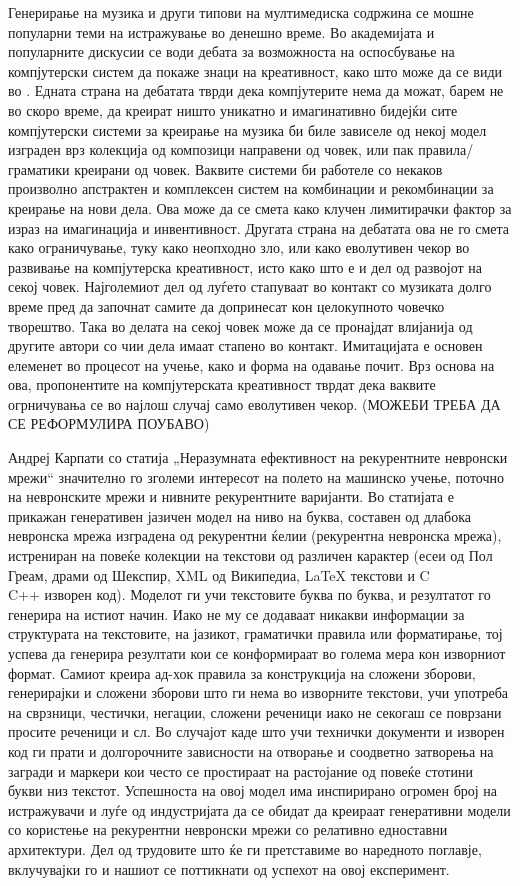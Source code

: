 Генерирање на музика и други типови на мултимедиска содржина се мошне популарни теми на истражување во денешно време. Во академијата и популарните дискусии се води дебата за возможноста на оспосбување на компјутерски систем да покаже знаци на креативност, како што може да се види во \cite{Ghedini2015}. Едната страна на дебатата тврди дека компјутерите нема да можат, барем не во скоро време, да креират ништо уникатно и имагинативно бидејќи сите компјутерски системи за креирање на музика би биле зависеле од некој модел изграден врз колекција од композици направени од човек, или пак правила/граматики креирани од човек. Ваквите системи би работеле со некаков произволно апстрактен и комплексен систем на комбинации и рекомбинации за креирање на нови дела. Ова може да се смета како клучен лимитирачки фактор за израз на имагинација и инвентивност. Другата страна на дебатата ова не го смета како ограничување, туку како неопходно зло, или како еволутивен чекор во развивање на компјутерска креативност, исто како што е и дел од развојот на секој човек. Најголемиот дел од луѓето стапуваат во контакт со музиката долго време пред да започнат самите да допринесат кон целокупното човечко творештво. Така во делата на секој човек може да се пронајдат влијанија од другите автори со чии дела имаат стапено во контакт. Имитацијата е основен елеменет во процесот на учење, како и форма на одавање почит. Врз основа на ова, пропонентите на компјутерската креативност тврдат дека ваквите огрничувања се во најлош случај само еволутивен чекор. (МОЖЕБИ ТРЕБА ДА СЕ РЕФОРМУЛИРА ПОУБАВО)

Андреј Карпати со статија „Неразумната ефективност на рекурентните невронски мрежи“ \cite{AndrejKarpathy2015} значително го зголеми интересот на полето на машинско учење, поточно на невронските мрежи и нивните рекурентните варијанти. Во статијата е прикажан генеративен јазичен модел на ниво на буква, составен од длабока невронска мрежа изградена од рекурентни ќелии (рекурентна невронска мрежа), истрениран на повеќе колекции на текстови од различен карактер (есеи од Пол Греам, драми од Шекспир, XML од Википедиа, LaTeX текстови и C\\C++ изворен код). Моделот ги учи текстовите буква по буква, и резултатот го генерира на истиот начин. Иако не му се додаваат никакви информации за структурата на текстовите, на јазикот, граматички правила или форматирање, тој успева да генерира резултати кои се конформираат во голема мера кон изворниот формат. Самиот креира ад-хок правила за конструкција на сложени зборови, генерирајки и сложени зборови што ги нема во изворните текстови, учи употреба на сврзници, честички, негации, сложени реченици иако не секогаш се поврзани просите реченици и сл. Во случајот каде што учи технички документи и изворен код ги прати и долгорочните зависности на отворање и соодветно затворења на загради и маркери кои често се простираат на растојание од повеќе стотини букви низ текстот. Успешноста на овој модел има инспирирано огромен број на истражувачи и луѓе од индустријата да се обидат да креираат генеративни модели со користење на рекурентни невронски мрежи со релативно едноставни архитектури. Дел од трудовите што ќе ги претставиме во наредното поглавје, вклучувајки го и нашиот се поттикнати од успехот на овој експеримент.

